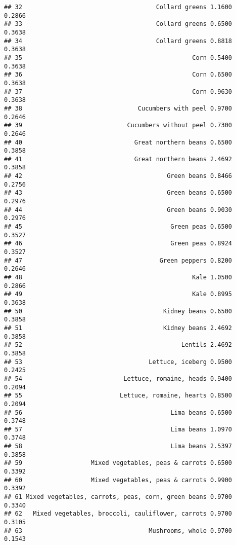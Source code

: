 \documentclass[
]{article}
\begin{document}
\begin{verbatim}
## 32                                     Collard greens 1.1600            0.2866
## 33                                     Collard greens 0.6500            0.3638
## 34                                     Collard greens 0.8818            0.3638
## 35                                               Corn 0.5400            0.3638
## 36                                               Corn 0.6500            0.3638
## 37                                               Corn 0.9630            0.3638
## 38                                Cucumbers with peel 0.9700            0.2646
## 39                             Cucumbers without peel 0.7300            0.2646
## 40                               Great northern beans 0.6500            0.3858
## 41                               Great northern beans 2.4692            0.3858
## 42                                        Green beans 0.8466            0.2756
## 43                                        Green beans 0.6500            0.2976
## 44                                        Green beans 0.9030            0.2976
## 45                                         Green peas 0.6500            0.3527
## 46                                         Green peas 0.8924            0.3527
## 47                                      Green peppers 0.8200            0.2646
## 48                                               Kale 1.0500            0.2866
## 49                                               Kale 0.8995            0.3638
## 50                                       Kidney beans 0.6500            0.3858
## 51                                       Kidney beans 2.4692            0.3858
## 52                                            Lentils 2.4692            0.3858
## 53                                   Lettuce, iceberg 0.9500            0.2425
## 54                            Lettuce, romaine, heads 0.9400            0.2094
## 55                           Lettuce, romaine, hearts 0.8500            0.2094
## 56                                         Lima beans 0.6500            0.3748
## 57                                         Lima beans 1.0970            0.3748
## 58                                         Lima beans 2.5397            0.3858
## 59                   Mixed vegetables, peas & carrots 0.6500            0.3392
## 60                   Mixed vegetables, peas & carrots 0.9900            0.3392
## 61 Mixed vegetables, carrots, peas, corn, green beans 0.9700            0.3340
## 62   Mixed vegetables, broccoli, cauliflower, carrots 0.9700            0.3105
## 63                                   Mushrooms, whole 0.9700            0.1543

\end{verbatim}
\end{document}
